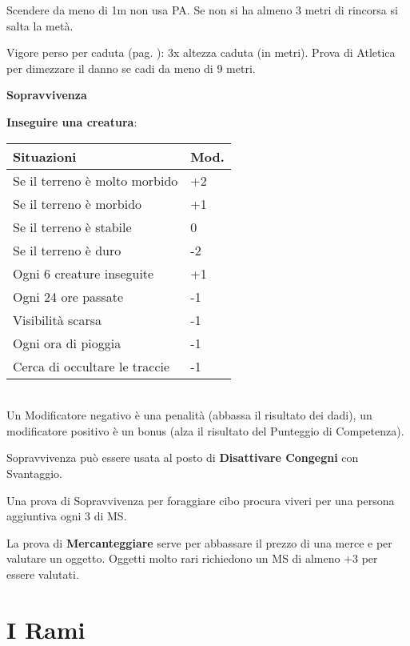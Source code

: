 \documentclass[12pt,a4paper,twoside,openany]{book}
\begin{document}
\begin{multicols}{2}
Scendere da meno di 1m non usa PA. Se non si ha almeno 3 metri di rincorsa si salta la metà.

Vigore perso per caduta (pag. \pageref{cadute}): 3x altezza caduta (in metri). Prova di Atletica per dimezzare il danno se cadi da meno di 9 metri.

\medskip

\textbf{Sopravvivenza}

\smallskip

\textbf{Inseguire una creatura}:

\begin{tabular}{ll}
	Situazioni & Mod.\\
	\toprule
	Se il terreno è molto morbido& +2\\
	Se il terreno è morbido& +1\\
	Se il terreno è stabile& 0\\
	Se il terreno è duro& -2\\
	Ogni 6 creature inseguite& +1\\
	Ogni 24 ore passate & -1\\
	Visibilità scarsa&-1\\
	Ogni ora di pioggia&-1 \\
	Cerca di occultare le traccie& -1\\
\end{tabular}\\

Un Modificatore negativo è una penalità (abbassa il risultato dei dadi), un modificatore positivo è un bonus (alza il risultato del Punteggio di Competenza).

Sopravvivenza può essere usata al posto di \textbf{Disattivare Congegni} con Svantaggio.

Una prova di Sopravvivenza per foraggiare cibo procura viveri per una persona aggiuntiva ogni 3 di MS.

\medskip

La prova di \textbf{Mercanteggiare} serve per abbassare il prezzo di una merce e per valutare un oggetto. Oggetti molto rari richiedono un MS di almeno +3 per essere valutati.


\end{multicols}

\pagebreak


\section{I Rami}
\end{document}
